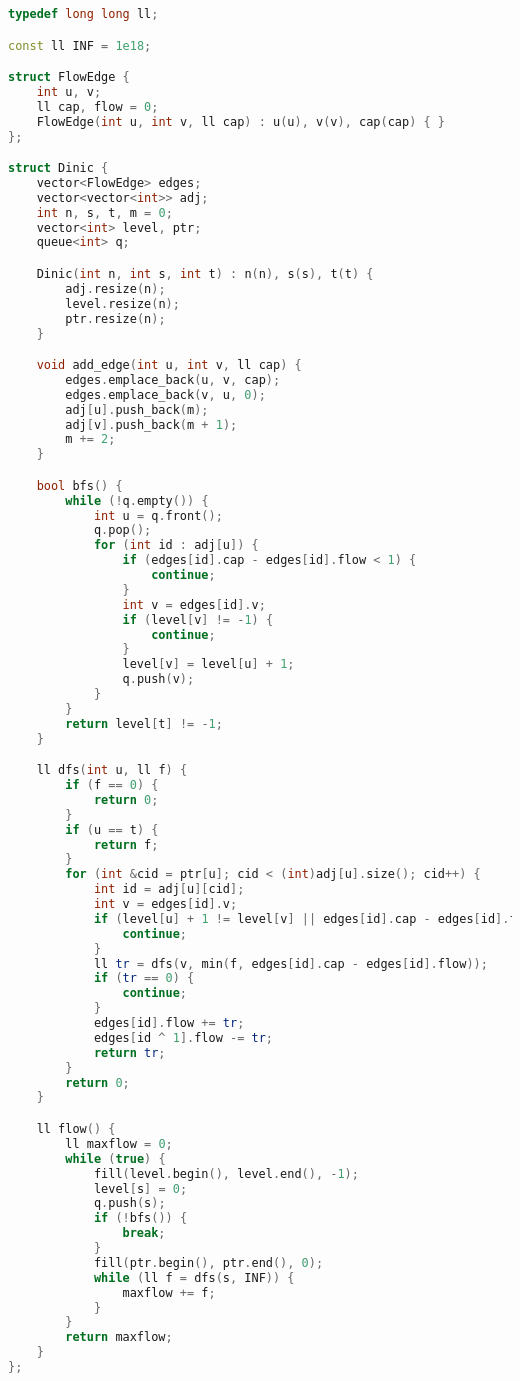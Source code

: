 \documentclass[10pt, a4paper, oneside]{book}
\begin{document}
\begin{lstlisting}[language=C++]
typedef long long ll;

const ll INF = 1e18;

struct FlowEdge {
    int u, v;
    ll cap, flow = 0;
    FlowEdge(int u, int v, ll cap) : u(u), v(v), cap(cap) { }
};

struct Dinic {
    vector<FlowEdge> edges;
    vector<vector<int>> adj;
    int n, s, t, m = 0;
    vector<int> level, ptr;
    queue<int> q;

    Dinic(int n, int s, int t) : n(n), s(s), t(t) {
        adj.resize(n);
        level.resize(n);
        ptr.resize(n);
    }

    void add_edge(int u, int v, ll cap) {
        edges.emplace_back(u, v, cap);
        edges.emplace_back(v, u, 0);
        adj[u].push_back(m);
        adj[v].push_back(m + 1);
        m += 2;
    }

    bool bfs() {
        while (!q.empty()) {
            int u = q.front();
            q.pop();
            for (int id : adj[u]) {
                if (edges[id].cap - edges[id].flow < 1) {
                    continue;
                }
                int v = edges[id].v;
                if (level[v] != -1) {
                    continue;
                }
                level[v] = level[u] + 1;
                q.push(v);
            }
        }
        return level[t] != -1;
    }

    ll dfs(int u, ll f) {
        if (f == 0) {
            return 0;
        }
        if (u == t) {
            return f;
        }
        for (int &cid = ptr[u]; cid < (int)adj[u].size(); cid++) {
            int id = adj[u][cid];
            int v = edges[id].v;
            if (level[u] + 1 != level[v] || edges[id].cap - edges[id].flow < 1) {
                continue;
            }
            ll tr = dfs(v, min(f, edges[id].cap - edges[id].flow));
            if (tr == 0) {
                continue;
            }
            edges[id].flow += tr;
            edges[id ^ 1].flow -= tr;
            return tr;
        }
        return 0;
    }

    ll flow() {
        ll maxflow = 0;
        while (true) {
            fill(level.begin(), level.end(), -1);
            level[s] = 0;
            q.push(s);
            if (!bfs()) {
                break;
            }
            fill(ptr.begin(), ptr.end(), 0);
            while (ll f = dfs(s, INF)) {
                maxflow += f;
            }
        }
        return maxflow;
    }
};
\end{lstlisting}
\hfill
\end{document}
